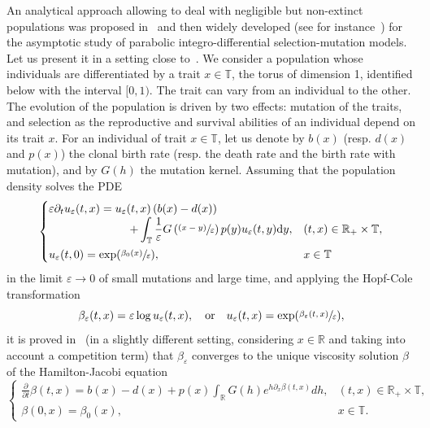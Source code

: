 \documentclass[10pt]{amsart}
\newcommand{\psfrac}[2]{\sfrac{(#1)}{#2}}
\theoremstyle{plain}
\theoremstyle{remark}
\newcommand\T{\mathbb{T}}
\newcommand\R{\mathbb{R}}
\let\dpl\displaystyle
\begin{document}
An analytical approach allowing to deal with negligible but non-extinct populations was proposed in~\cite{diekmannjabinmischlerperthame} {and then widely developed (see for instance~\cite{BP.GB:08,Barles2009,LMP}) for the asymptotic study of parabolic integro-differential selection-mutation models}. Let us present it in a setting close to~\cite{Barles2009}. We consider a population whose individuals are differentiated by a trait $x\in \mathbb{T}$, the torus of dimension 1, identified below with the interval $[0,1)$. The trait can vary from an individual to the other.
The evolution of the population is driven by two effects: mutation of the traits, and selection as the reproductive and survival abilities of an individual depend on its trait $x$.
For an individual of trait $x\in \mathbb{T}$, let us denote by $b(x)$ (resp. $d(x)$ and $p(x)$) the clonal birth rate (resp. the death rate and the birth rate with mutation), and by $G(h)$ the mutation kernel. Assuming that the population density solves the PDE
\begin{equation}
\label{eq:PDE}
\begin{cases} \varepsilon\partial_t u_\varepsilon(t,x)=u_\varepsilon(t,x)\left(b(x)-d(x)\right) & \\
\hspace{2.5cm}+\dpl\int_{\mathbb{T}}\frac{1}{\varepsilon}G\left(\psfrac{x-y}{\varepsilon}\right)
p(y)u_\varepsilon(t,y)\mathrm dy, & (t,x)\in\R_+\times\T,\\[8pt]
u_\varepsilon(t,0)=\exp(\sfrac{\beta_0(x)}{\varepsilon}), & x\in\T
\end{cases}
\end{equation}
in the limit $\varepsilon\to 0$ of small mutations and large time, and applying the Hopf-Cole transformation
\begin{equation}
\label{eq:Hopf-Cole}
\beta_\varepsilon(t,x)=\varepsilon\log u_\varepsilon(t,x),\quad\text{or}\quad u_\varepsilon(t,x)=\exp(\sfrac{\beta_\varepsilon(t,x)}{\varepsilon}),
\end{equation}
it is proved in~\cite{Barles2009} (in a slightly different setting{, considering $x\in \R$ and taking into account a competition term}) that $\beta_\varepsilon$ converges to the unique viscosity solution $\beta$ of the Hamilton-Jacobi equation
\begin{equation}
\label{eq:HJ_intro}
\begin{cases}
\dpl\frac{\partial}{\partial t} \beta(t,x)=b(x)-d(x)+ p(x) \int_{\R} G(h)e^{h\partial_x \beta(t,x)} dh, & (t,x)\in\R_+\times\T,\\
\beta(0,x)=\beta_0(x), & x\in\T.
\end{cases}
\end{equation}
\end{document}
